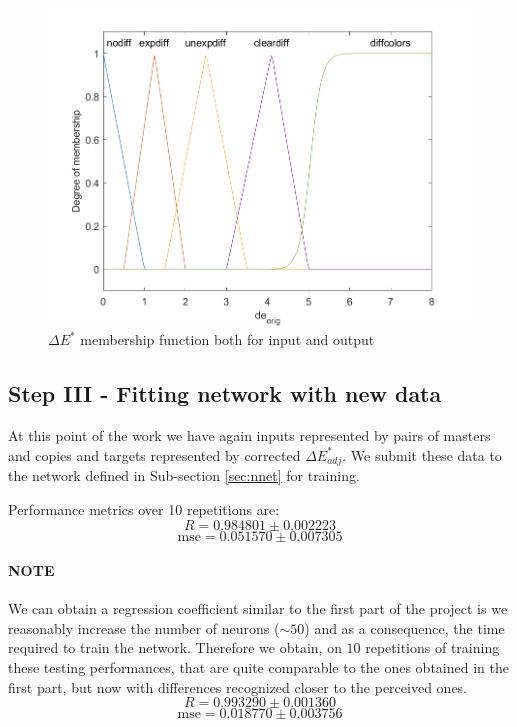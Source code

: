 \documentclass[twocolumn,a4paper]{article}
\begin{document}
\begin{figure}
	\centering
	\includegraphics[scale=0.5]{images/mf_de.png}
	\caption{$\Delta E^{*}$ membership function both for input and output}
	\label{fig:mfde}
\end{figure}
\clearpage
\subsection{Step III - Fitting network with new data} At this point of the work we have again inputs represented by pairs of masters and copies and targets represented  by corrected $\Delta E^*_{adj}$. We submit these data to the network defined in Sub-section \ref{sec:nnet} for training.

Performance metrics over 10 repetitions are:
\begin{equation}
	R=0.984801 \pm 0.002223
\end{equation}
\begin{equation}
\text{mse} = 0.051570 \pm 0.007305
\end{equation}
\paragraph{NOTE} We can obtain a regression coefficient similar to the first part of the project is we reasonably increase the number of neurons ($\sim 50$) and as a consequence, the time required to train the network. Therefore we obtain, on $10$ repetitions of training these testing performances, that are quite comparable to the ones obtained in the first part, but now with differences recognized closer to the perceived ones. 
\begin{equation}
	R=0.993290 \pm 0.001360
\end{equation}
\begin{equation}
	\text{mse} = 0.018770 \pm 0.003756
\end{equation}
\end{document}

